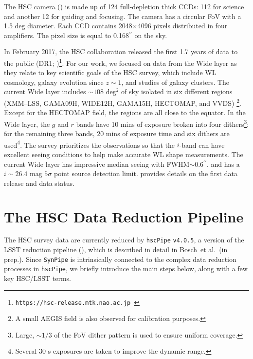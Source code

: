 \documentclass[useamsfonts]{pasj01}
\def\asec{$^{\prime\prime}$}
\def\etal{{\ et al.~}}
\def\hscpipe{\texttt{hscPipe}}
\def\synpipe{\texttt{SynPipe}}
\begin{document}
    The HSC camera (\citealt{Miyazaki2012}) is made up of 124 full-depletion thick 
    CCDs: 112 for science and another 12 for guiding and focusing.
    The camera has a circular FoV with a 1.5 deg diameter.
    Each CCD contains 2048$\times$4096 pixels distributed in four amplifiers.
    The pixel size is equal to 0.168\asec{} on the sky.

    In February 2017, the HSC collaboration released the first 1.7 years of data to 
    the public (DR1; 
    \citealt{HSCDR1})\footnote{\texttt{https://hsc-release.mtk.nao.ac.jp }}.
    For our work, we focused on data from the Wide layer as they relate to key 
    scientific goals of the HSC survey, which include WL cosmology, galaxy evolution 
    since $z{\sim}1$, and studies of galaxy clusters.
    The current Wide layer includes ${\sim}108$ deg$^2$ of sky isolated in
   six different regions (XMM--LSS, GAMA09H, WIDE12H, GAMA15H, HECTOMAP, and VVDS)
    \footnote{A small AEGIS field is also observed for calibration purposes.}.
    Except for the HECTOMAP field, the regions are all close to the equator. 
    In the Wide layer, the $g$ and $r$ bands have 10 mins of exposure broken into four
    dithers\footnote{Large, ${\sim}1/3$ of the FoV dither pattern is used to ensure
    uniform coverage.}; for the remaining three bands, 20 mins of exposure time and six
    dithers are used\footnote{Several 30 s exposures are taken to improve the 
    dynamic range.}.
    The survey prioritizes the observations so that the $i$-band can have excellent
    seeing conditions to help make accurate WL shape measurements.
    The current Wide layer has impressive median seeing with FWHM${\sim}0.6$\asec{},
    and has a $i{\sim} 26.4$ mag $5\sigma$ point source detection limit. 
    \citealt{HSCDR1} provides details on the first data release and data status.
 

\section{The HSC Data Reduction Pipeline}
    \label{ssec:hscpipe}

    The HSC survey data are currently reduced by \hscpipe{} \texttt{v4.0.5}, a
    version of the LSST reduction pipeline (\citealt{Ivezic2008, Axelrod2010,
    Juric2015}), which is described in detail in Bosch\etal (in prep.).
    Since \synpipe{} is intrinsically connected to the complex data reduction
    processes in \hscpipe{}, we briefly introduce the main steps below, along with
    a few key HSC/LSST terms.
\end{document}
